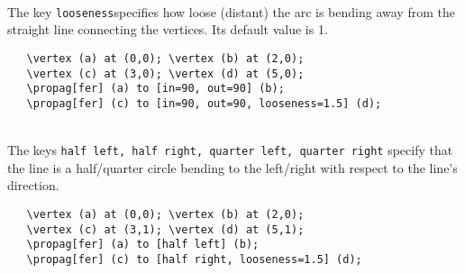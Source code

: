 \documentclass[10pt,letterpaper,twoside,notitlepage]{article}
\numberwithin{figure}{section}
\begin{document}
\\
The key \vercol\verb$looseness$\txcol specifies
how loose (distant) the arc is bending away
from the straight line connecting the vertices.
Its default value is 1.
\vspace{2mm}\\
%
\begin{minipage}{0.7\linewidth}
\vercol\begin{verbatim}
   \vertex (a) at (0,0); \vertex (b) at (2,0);
   \vertex (c) at (3,0); \vertex (d) at (5,0);
   \propag[fer] (a) to [in=90, out=90] (b);
   \propag[fer] (c) to [in=90, out=90, looseness=1.5] (d);
\end{verbatim}\txcol
\end{minipage}
%
\begin{minipage}{0.25\linewidth}
\end{minipage}
\\
The keys \vercol\verb$half left, half right, quarter left, quarter right$\txcol
specify that the line is a half/quarter circle bending to the left/right
with respect to the line's direction.
\vspace{2mm}\\
%
\begin{minipage}{0.7\linewidth}
\vercol\begin{verbatim}
   \vertex (a) at (0,0); \vertex (b) at (2,0);
   \vertex (c) at (3,1); \vertex (d) at (5,1);
   \propag[fer] (a) to [half left] (b);
   \propag[fer] (c) to [half right, looseness=1.5] (d);
\end{verbatim}\txcol
\end{minipage}
%
\begin{minipage}{0.25\linewidth}
\end{minipage}
\end{document}
